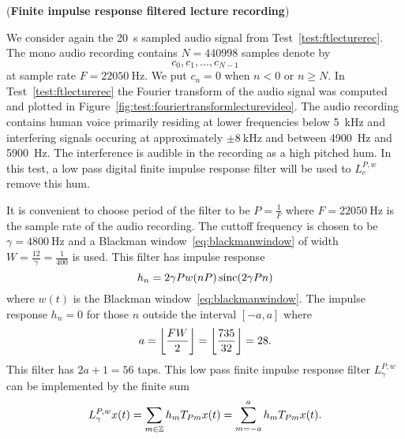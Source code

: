 \begin{test}\label{test:firfilteredlecturerec}
(\textbf{Finite impulse response filtered lecture recording})

We consider again the \SI{20}{\second} sampled audio signal from Test~\ref{test:ftlecturerec}.  The mono audio recording contains $N = 440998$ samples denote by 
\[
c_0,c_1,\dots,c_{N-1}
\]
at sample rate $F = \SI{22050}{\hertz}$.  We put $c_n = 0$ when $n < 0$ or $n \geq N$.  In Test~\ref{test:ftlecturerec} the Fourier transform of the audio signal was computed and plotted in Figure~\ref{fig:test:fouriertransformlecturevideo}. The audio recording contains human voice primarily residing at lower frequencies below \SI{5}{\kilo\hertz} and interfering signals occuring at approximately $\pm\SI{8}{\kilo\hertz}$ and between \SI{4900}{\hertz} and \SI{5900}{\hertz}.  The interference is audible in the recording as a high pitched hum.  In this test, a low pass digital finite impulse response filter will be used to $L_{c}^{P,w}$ remove this hum.

It is convenient to choose period of the filter to be $P = \tfrac{1}{F}$ where $F = \SI{22050}{\hertz}$ is the sample rate of the audio recording.  The cuttoff frequency is chosen to be $\gamma = \SI{4800}{\hertz}$ and a Blackman window~\eqref{eq:blackmanwindow} of width $W=\tfrac{12}{\gamma} = \tfrac{1}{400}$ is used.  This filter has impulse response
\[
h_n = 2 \gamma P w( nP ) \operatorname{sinc}( 2\gamma P n)
\]
where $w(t)$ is the Blackman window~\eqref{eq:blackmanwindow}.  The impulse response $h_n = 0$ for those $n$ outside the interval $[-a,a]$ where
\[
a = {\left\lfloor \frac{FW}{2} \right\rfloor} = {\left\lfloor \frac{735}{32} \right\rfloor} = 28.
\] 
This filter has $2a+1 = 56$ taps.  This low pass finite impulse response filter $L_\gamma^{P,w}$ can be implemented by the finite sum
\[
L_\gamma^{P,w}x(t) = \sum_{m \in {\mathbb Z}} h_m T_{Pm}x(t) = \sum_{m = -a}^a h_m T_{Pm}x(t) .
\]


\end{test}
